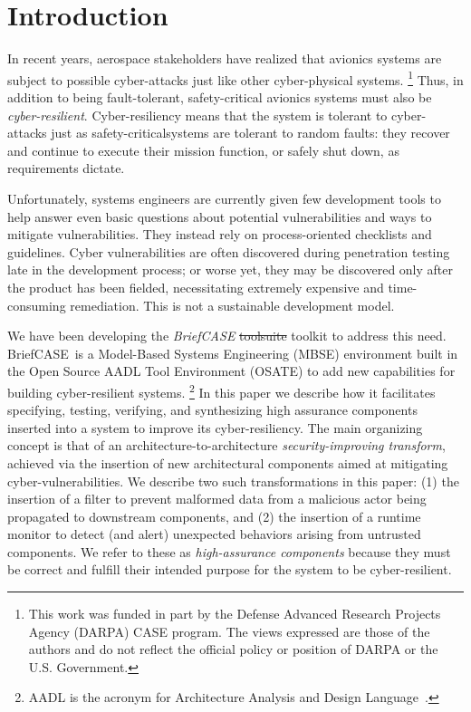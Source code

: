 \documentclass[global,twocolumn]{svjour}
\newcommand{\oldjunk}[1]{\sout{#1}}
\newcommand{\brfcs}{BriefCASE}
\begin{document}

\section{Introduction} \label{sec:intro}
In recent years, aerospace stakeholders have realized that avionics systems are subject to possible cyber-attacks just like other cyber-physical systems.
%
\footnote{This work was funded in part by the
Defense Advanced Research Projects Agency (DARPA) CASE program.
%
The views expressed are those of the authors and do not reflect the official
policy or position of DARPA or the U.S. Government.}
%
Thus, in addition to being fault-tolerant, safety-critical avionics systems must also be {\em cyber-resilient}.
%
Cyber-resiliency means that the system is tolerant to cyber-attacks just as safety-criticalsystems are tolerant to random faults: they recover and continue to execute their mission function, or safely shut down, as requirements dictate.

Unfortunately, systems engineers are currently given few development tools to help answer even basic questions about potential vulnerabilities and ways to mitigate vulnerabilities.  They instead rely on process-oriented checklists and guidelines.
%
Cyber vulnerabilities are often discovered during penetration testing late in the development process;
%
or worse yet, they may be discovered only after the product has been fielded, necessitating extremely expensive and time-consuming remediation. This is not a sustainable development model.

We have been developing the {\em BriefCASE} \oldjunk{toolsuite} toolkit to address this need.
%
\brfcs\ is a Model-Based Systems Engineering (MBSE) environment built in the Open Source AADL Tool Environment (OSATE) to add new capabilities for building cyber-resilient systems.
%
\footnote{AADL is the acronym for Architecture Analysis and Design Language~\cite{aadl}.}
%
In this paper we describe how it facilitates specifying, testing, verifying, and synthesizing high assurance components inserted into a system to improve its cyber-resiliency.
%
The main organizing concept is that of an architecture-to-architecture \emph{security-improving transform}, achieved via the insertion of new architectural components aimed at mitigating cyber-vulnerabilities.
%
We describe two such transformations in this paper: (1) the insertion of a filter to prevent malformed data from a malicious actor being propagated to downstream components, and (2) the insertion of a runtime monitor to detect (and alert) unexpected behaviors arising from untrusted components.
%
We refer to these as \emph{high-assurance components} because they must be correct and fulfill their intended purpose for the system to be cyber-resilient.
\end{document}
